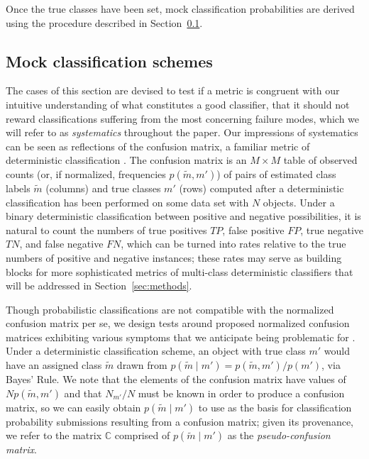 Once the true classes have been set, mock classification probabilities are derived using the procedure described in Section~\ref{sec:mockdata}.

\subsection{Mock classification schemes}
\label{sec:mockdata}

The cases of this section are devised to test if a metric is congruent with our intuitive understanding of what constitutes a good classifier, that it should not reward classifications suffering from the most concerning failure modes, which we will refer to as \textit{systematics} throughout the paper.
Our impressions of systematics can be seen as reflections of the confusion matrix, a familiar metric of deterministic classification \citep{2012PASP..124.1175B}.
The confusion matrix is an $M \times M$ table of observed counts (or, if normalized, frequencies $p(\tilde{m}, m')$) of pairs of estimated class labels $\tilde{m}$ (columns) and true classes $m'$ (rows) computed after a deterministic classification has been performed on some data set with $N$ objects.
Under a binary deterministic classification between positive and negative possibilities, it is natural to count the numbers of true positives $TP$, false positive $FP$, true negative $TN$, and false negative $FN$, which can be turned into rates relative to the true numbers of positive and negative instances; these rates may serve as building blocks for more sophisticated metrics of multi-class deterministic classifiers that will be addressed in Section~\ref{sec:methods}.

Though probabilistic classifications are not compatible with the normalized confusion matrix per se, we design tests around proposed normalized confusion matrices exhibiting various symptoms that we anticipate being problematic for \lsst.
Under a deterministic classification scheme, an object with true class $m'$ would have an assigned class $\tilde{m}$ drawn from $p(\tilde{m} \mid m') = p(\tilde{m}, m') / p(m')$, via Bayes' Rule.
We note that the elements of the confusion matrix have values of $N p(\tilde{m}, m')$ and that $N_{m'} / N$ must be known in order to produce a confusion matrix, so we can easily obtain $p(\tilde{m} \mid m')$ to use as the basis for classification probability submissions resulting from a confusion matrix; given its provenance, we refer to the matrix $\mathbb{C}$ comprised of $p(\tilde{m} \mid m')$ as the \textit{pseudo-confusion matrix}.


